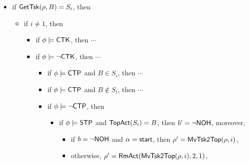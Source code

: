 \begin{itemize}
    \item if $\mathsf{GetTsk}(\rho,B) = S_i$, then
    \begin{itemize}
    \item if $i \neq 1$, then 
        \begin{itemize}
            \item if $\phi \models {\sf CTK}$, then $\cdots$ 
            \item if $\phi \models \neg {\sf CTK}$, then $\cdots$
                \begin{itemize}
                    \item if $\phi \models{\sf CTP}$ and $B \in S_i$, then $\cdots$
                    \item if $\phi \models{\sf CTP}$ and $B \notin S_i$, then $\cdots$
                    \item if $\phi \models\neg{\sf CTP}$, then
                            \begin{itemize}
                                \item if $\phi\models{\sf STP}$ and $\mathsf{TopAct}(S_i) = B$, then $b' = \neg {\sf NOH}$, moreover,
                                \begin{itemize}
                                    \item if $b = \neg {\sf NOH}$ and $\alpha = {\mathsf{start} }$, then $\rho'=\mathsf{MvTsk2Top}(\rho, i)$,
                                    \item otherwise, $\rho' = \mathsf{RmAct}(\mathsf{MvTsk2Top}(\rho, i), 2, 1)$, 

\end{itemize}
\end{itemize}
\end{itemize}
\end{itemize}
\end{itemize}
\end{itemize}
